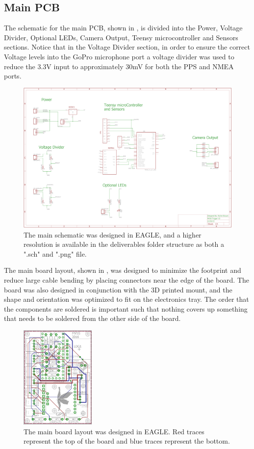\subsection{Main PCB}
The schematic for the main PCB, shown in , is divided into the Power, Voltage Divider, Optional LEDs, Camera Output, Teensy microcontroller and Sensors sections.  Notice that in the Voltage Divider section, in order to ensure the correct Voltage levels into the GoPro microphone port a voltage divider was used to reduce the 3.3V input to approximately 30mV for both the PPS and NMEA ports. 

\begin{figure}[h]
	\centering
	\includegraphics[width = .75\linewidth]{../figures/Schematic.png}
	\caption{The main schematic was designed in EAGLE, and a higher resolution is available in the deliverables folder structure as both a ".sch" and ".png" file.}
	\label{fig:schematic}
\end{figure}

The main board layout, shown in , was designed to minimize the footprint and reduce large cable bending by placing connectors near the edge of the board.  The board was also designed in conjunction with the 3D printed mount, and the shape and orientation was optimized to fit on the electronics tray.  The order that the components are soldered is important such that nothing covers up something that needs to be soldered from the other side of the board.

\begin{figure}[H]
	\centering
	\includegraphics[height = 2in]{../figures/board.png}
	\caption{The main board layout was designed in EAGLE. Red traces represent the top of the board and blue traces represent the bottom.}
	\label{fig:board}
\end{figure}
